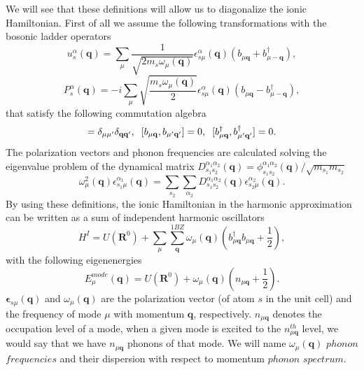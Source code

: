 We will see that these definitions will allow us to diagonalize the ionic Hamiltonian. First of all we assume the following transformations with the bosonic ladder operators
\begin{equation}
 \label{displacement-quantization}
 u_{s}^{\alpha}(\mathbf{q})=\sum_{\mu}\frac{1}{\sqrt{2m_{s}\omega_{\mu}(\mathbf{q})}}\epsilon_{s\mu}^{\alpha}(\mathbf{q})(b_{\mu\mathbf{q}}+b_{\mu-\mathbf{q}}^{\dagger}),
\end{equation}
\begin{equation}
 \label{momentum-quantization}
 P_{s}^{\alpha}(\mathbf{q})=-i\sum_{\mu}\sqrt{\frac{m_{s}\omega_{\mu}(\mathbf{q})}{2}}\epsilon_{s\mu}^{\alpha}(\mathbf{q})(b_{\mu\mathbf{q}}-b_{\mu-\mathbf{q}}^{\dagger}),
\end{equation}
that satisfy the following commutation algebra
\begin{equation}
 [b_{\mu\mathbf{q}},b^{\dagger}_{\mu'\mathbf{q}'}]=\delta_{\mu\mu'}\delta_{\mathbf{q}\mathbf{q}'}, \hspace{0.2cm} [b_{\mu\mathbf{q}},b_{\mu'\mathbf{q}'}]=0, \hspace{0.2cm} 
 [b^{\dagger}_{\mu\mathbf{q}},b^{\dagger}_{\mu'\mathbf{q}'}]=0.
\end{equation}
The polarization vectors and phonon frequencies are calculated solving the eigenvalue problem of the dynamical matrix $D_{s_{1}s_{2}}^{\alpha_{1}\alpha_{2}}(\mathbf{q})=\phi_{s_{1}s_{2}}^{\alpha_{1}\alpha_{
2}}(\mathbf{q})/\sqrt{m_{s_{1}}m_{s_{2}}}$
\begin{equation}
 \omega_{\mu}^{2}(\mathbf{q})\epsilon_{s_{1}\mu}^{\alpha_{1}}(\mathbf{q})=\sum_{s_{2}}\sum_{\alpha_{2}}D_{s_{1}s_{2}}^{\alpha_{1}\alpha_{2}}(\mathbf{q})\epsilon_{s_{2}\mu}^{\alpha_{2}}(\mathbf{q}).
\end{equation}
By using these definitions, the ionic Hamiltonian in the harmonic approximation can be written as a sum of independent harmonic oscillators\cite{ashcroft1976solid,mahan2013many,born1954dynamical}
\begin{equation}
 \label{diagonal-ionic-hamiltonian}
 H^{I}=U(\mathbf{R}^{0})+\sum_{\mu}\sum_{\mathbf{q}}^{1BZ}\omega_{\mu}(\mathbf{q})\left(b_{\mu\mathbf{q}}^{\dagger}b_{\mu\mathbf{q}}+\frac{1}{2}\right),
\end{equation}
with the following eigenenergies
\begin{equation}
 \label{ionic-eigenvalues}
 E^{mode}_{\mu}(\mathbf{q})=U(\mathbf{R}^{0})+\omega_{\mu}(\mathbf{q})\left(n_{\mu\mathbf{q}}+\frac{1}{2}\right).
\end{equation}
$\boldsymbol{\epsilon}_{s\mu}(\mathbf{q})$ and $\omega_{\mu}(\mathbf{q})$ are the polarization vector (of atom $s$ in the unit cell) and the frequency of mode $\mu$ with 
momentum $\mathbf{q}$, respectively. $n_{\mu\mathbf{q}}$ denotes the occupation level of a mode, when a given mode is excited to the $n^{th}_{\mu\mathbf{q}}$ level, we would say that we have $n_{\mu\mathbf{q}}$ 
phonons of that mode. We will name $\omega_{\mu}(\mathbf{q})$ $phonon$ $frequencies$ and their dispersion with respect to momentum $phonon$ $spectrum$. \\

